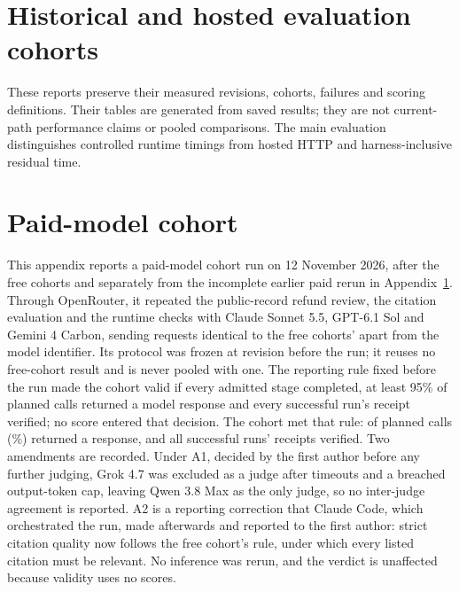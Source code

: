 \documentclass[11pt]{article}
\newcommand{\code}[1]{\texttt{\small #1}}
\begin{document}

\FloatBarrier
\clearpage

\clearpage
\section{Historical and hosted evaluation cohorts}\label{app:hosted-details}

These reports preserve their measured revisions, cohorts, failures and scoring definitions. Their tables are generated from saved results; they are not current-path performance claims or pooled comparisons. The main evaluation distinguishes controlled runtime timings from hosted HTTP and harness-inclusive residual time.


\FloatBarrier

\FloatBarrier

\FloatBarrier

\FloatBarrier
\clearpage
\section{Paid-model cohort}\label{app:paid-cohort}

This appendix reports a paid-model cohort run on 12 November 2026, after the free cohorts and separately from the incomplete earlier paid rerun in Appendix~\ref{app:hosted-details}. Through OpenRouter, it repeated the public-record refund review, the citation evaluation and the runtime checks with Claude Sonnet 5.5, GPT-6.1 Sol and Gemini 4 Carbon, sending requests identical to the free cohorts' apart from the model identifier. Its protocol was frozen at revision \code{\PaidRevision} before the run; it reuses no free-cohort result and is never pooled with one. The reporting rule fixed before the run made the cohort valid if every admitted stage completed, at least 95\% of planned calls returned a model response and every successful run's receipt verified; no score entered that decision. The cohort met that rule: \PaidRespondedCalls{} of \PaidPlannedCalls{} planned calls (\PaidResponseRate\%) returned a response, and all \PaidReceiptsVerified{} successful runs' receipts verified. Two amendments are recorded. Under A1, decided by the first author before any further judging, Grok 4.7 was excluded as a judge after timeouts and a breached output-token cap, leaving Qwen 3.8 Max as the only judge, so no inter-judge agreement is reported. A2 is a reporting correction that Claude Code, which orchestrated the run, made afterwards and reported to the first author: strict citation quality now follows the free cohort's rule, under which every listed citation must be relevant. No inference was rerun, and the verdict is unaffected because validity uses no scores.

\PaidPublicRefundTable
\PaidQualityTable
\PaidCostTable
\FloatBarrier
\clearpage

\FloatBarrier
\clearpage

\FloatBarrier



\end{document}
